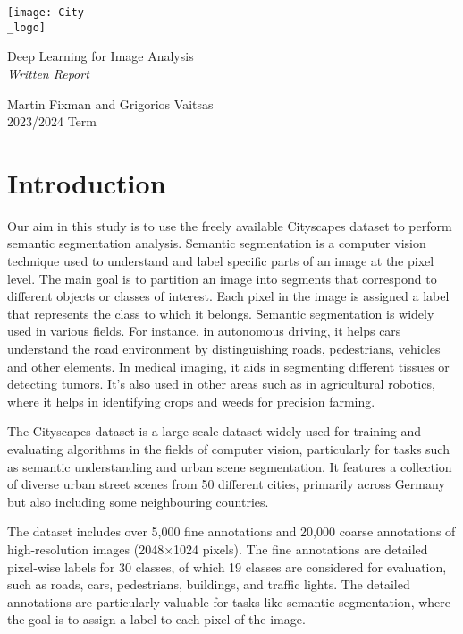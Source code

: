 \documentclass[a4paper,11pt]{article}
\begin{document}
\begin{titlepage}
	\centering
	\texttt{[image: City\\\_logo]} \\[4em]
	\begin{bfseries}
		\begin{Huge}
			Deep Learning for Image Analysis \\[35pt]
			\textsl{Written Report}
		\end{Huge}
	\end{bfseries}
	\vfill{}
	\begin{LARGE}
		\begin{sffamily}
			Martin Fixman and Grigorios Vaitsas \\[10pt]
			2023/2024 Term
		\end{sffamily}
	\end{LARGE}
\end{titlepage}

\section{Introduction}
Our aim in this study is to use the freely available Cityscapes dataset \cite{DBLP:journals/corr/CordtsORREBFRS16} to perform semantic segmentation analysis. Semantic segmentation is a computer vision technique used to understand and label specific parts of an image at the pixel level. The main goal is to partition an image into segments that correspond to different objects or classes of interest. Each pixel in the image is assigned a label that represents the class to which it belongs. Semantic segmentation is widely used in various fields. For instance, in autonomous driving, it helps cars understand the road environment by distinguishing roads, pedestrians, vehicles and other elements. In medical imaging, it aids in segmenting different tissues or detecting tumors. It's also used in other areas such as in agricultural robotics, where it helps in identifying crops and weeds for precision farming. 

The Cityscapes dataset is a large-scale dataset widely used for training and evaluating algorithms in the fields of computer vision, particularly for tasks such as semantic understanding and urban scene segmentation. It features a collection of diverse urban street scenes from 50 different cities, primarily across Germany but also including some neighbouring countries. 

The dataset includes over 5,000 fine annotations and 20,000 coarse annotations of high-resolution images (2048$\times$1024 pixels). The fine annotations are detailed pixel-wise labels for 30 classes, of which 19 classes are considered for evaluation, such as roads, cars, pedestrians, buildings, and traffic lights. The detailed annotations are particularly valuable for tasks like semantic segmentation, where the goal is to assign a label to each pixel of the image. 
\end{document}
